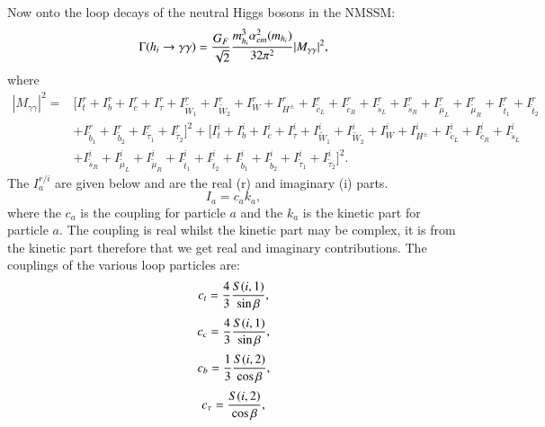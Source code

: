 \documentclass[final,3p,times,pdflatex]{elsarticle}
\begin{document}
Now onto the loop decays of the neutral Higgs bosons in the NMSSM:
\begin{equation} \label{hgamgamNMSSM}
\Gamma(h_i \rightarrow \gamma \gamma) = {G_{F} \over \sqrt{2}} {m_{h_i}^3 \alpha_{em}^2 (m_{h_i}) \over 32 \pi^2} |M_{\gamma \gamma}|^2,
\end{equation}
where 
\begin{equation}
\begin{aligned}
|M_{\gamma \gamma}|^2 = & \Big[I_{t}^{r} + I_{b}^{r} + I_{c}^{r} + I_{\tau}^{r} + I_{\tilde{W}_{1}}^{r} + I_{\tilde{W}_2}^{r} + I_{W}^{r} + I_{H^{\pm}}^{r} + I_{\tilde{c}_L}^{r} + I_{\tilde{c}_R}^{r} + I_{\tilde{s}_L}^{r} + I_{\tilde{s}_R}^{r} + I_{\tilde{\mu}_L}^{r} + I_{\tilde{\mu}_R}^{r} + I_{\tilde{t}_1}^{r} + I_{\tilde{t}_2}^{r} \\ & + I_{\tilde{b}_1}^{r} + I_{\tilde{b}_2}^{r} + I_{\tilde{\tau}_1}^{r} + I_{\tilde{\tau}_2}^{r}\Big]^2 + \Big[I_{t}^{i} + I_{b}^{i} + I_{c}^{i} + I_{\tau}^{i} + I_{\tilde{W}_{1}}^{i} + I_{\tilde{W}_2}^{i} + I_{W}^{i} + I_{H^{\pm}}^{i} + I_{\tilde{c}_L}^{i} + I_{\tilde{c}_R}^{i} + I_{\tilde{s}_L}^{i} \\ & + I_{\tilde{s}_R}^{i} + I_{\tilde{\mu}_L}^{i} + I_{\tilde{\mu}_R}^{i} + I_{\tilde{t}_1}^{i} + I_{\tilde{t}_2}^{i} + I_{\tilde{b}_1}^{i} + I_{\tilde{b}_2}^{i} + I_{\tilde{\tau}_1}^{i} + I_{\tilde{\tau}_2}^{i}\Big]^2.
\end{aligned}
\end{equation}
The $I_{a}^{r/i}$ are given below and are the real (r) and imaginary (i) parts.
\begin{equation}
I_{a} = c_{a}k_{a},
\end{equation}
where the $c_{a}$ is the coupling for particle $a$ and the $k_{a}$ is the kinetic part for particle $a$. The coupling is real whilst the kinetic part may be complex, it is from the kinetic part therefore that we get real and imaginary contributions. The couplings of the various loop particles are:
\begin{equation}
c_{t} = {4 \over 3}{S(i,1) \over \sin\beta},
\end{equation}
\begin{equation}
c_{c} = {4 \over 3}{S(i,1) \over \sin\beta},
\end{equation}
\begin{equation}
c_{b} = {1 \over 3}{S(i,2) \over \cos\beta},
\end{equation}
\begin{equation}
c_{\tau} = {S(i,2) \over \cos\beta},
\end{equation}
\end{document}
